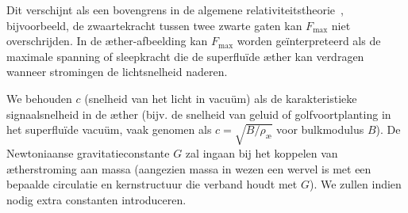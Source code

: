 Dit verschijnt als een bovengrens in de algemene relativiteitstheorie~\cite{Schiller2022-maxforce}, bijvoorbeeld, de zwaartekracht tussen twee zwarte gaten kan $F_\text{max}$ niet overschrijden. In de æther-afbeelding kan $F_\text{max}$ worden geïnterpreteerd als de maximale spanning of sleepkracht die de superfluïde æther kan verdragen wanneer stromingen de lichtsnelheid naderen.

We behouden $c$ (snelheid van het licht in vacuüm) als de karakteristieke signaalsnelheid in de æther (bijv. de snelheid van geluid of golfvoortplanting in het superfluïde vacuüm, vaak genomen als $c = \sqrt{B/\rho_\text{\ae}}$ voor bulkmodulus $B$). De Newtoniaanse gravitatieconstante $G$ zal ingaan bij het koppelen van ætherstroming aan massa (aangezien massa in wezen een wervel is met een bepaalde circulatie en kernstructuur die verband houdt met $G$). We zullen indien nodig extra constanten introduceren.